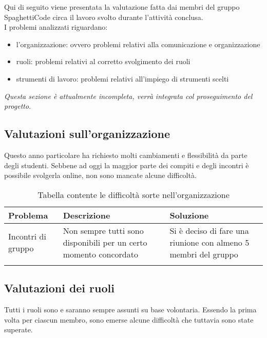 \documentclass[../piano_di_qualifica.tex]{subfiles}
\begin{document}
Qui di seguito viene presentata la valutazione fatta dai membri del gruppo SpaghettiCode circa il lavoro svolto durante l'attività conclusa.\\
I problemi analizzati riguardano:
\begin{itemize}
    \item l'organizzazione: ovvero problemi relativi alla comunicazione e organizzazione
    \item ruoli: problemi relativi al corretto svolgimento dei ruoli
    \item strumenti di lavoro: problemi relativi all'impiego di strumenti scelti
\end{itemize}

\emph{Questa sezione è attualmente incompleta, verrà integrata col proseguimento del progetto}.

\subsection{Valutazioni sull'organizzazione}
\label{sub:valut_org}
Questo anno particolare ha richiesto molti cambiamenti e flessibilità da parte degli studenti. Sebbene ad oggi la maggior parte dei compiti e 
degli incontri è possibile svolgerla online, non sono mancate alcune difficoltà.

\begin{center}
\begin{longtable}{|p{3cm}|p{4.5cm}|p{4.5cm}|}
		\hline
		\rowcolor{lightgray}
            \textbf{Problema} & \textbf{Descrizione} &  \textbf{Soluzione} \\ 
            \hline 
            Incontri di gruppo & 
            Non sempre tutti sono disponibili per un certo momento concordato &
            Si è deciso di fare una riunione con almeno 5 membri del gruppo \\
            \hline
\caption{Tabella contente le difficoltà sorte nell'organizzazione}
\end{longtable}
\end{center}


\subsection{Valutazioni dei ruoli}
\label{sub:valut_ruoli}
Tutti i ruoli sono e saranno sempre assunti su base volontaria. Essendo la prima volta per ciascun membro, sono emerse alcune difficoltà che tuttavia sono state superate.\par
\end{document}

